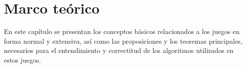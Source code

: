 \chapter{Marco teórico}

En este capítulo se presentan los conceptos básicos relacionados a los juegos en forma normal y extensiva, así como las proposiciones y los teoremas principales, necesarios para el entendimiento y correctitud de los algoritmos utilizados en estos juegos.




